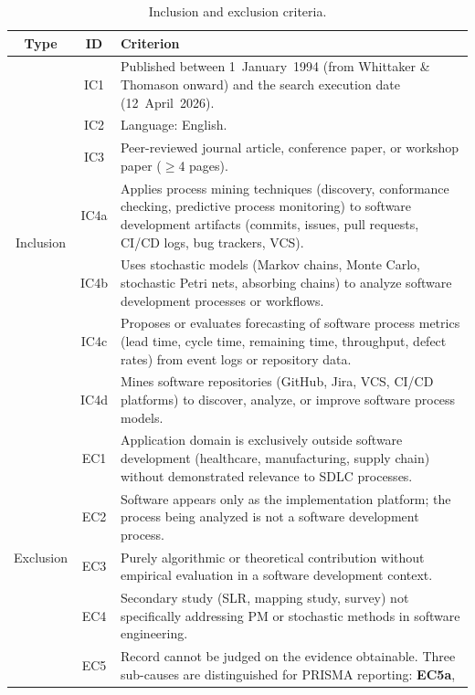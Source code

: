 \begin{table}[htbp]
\centering
\caption{Inclusion and exclusion criteria.}
\label{tab:criteria}
\small
\setlength{\tabcolsep}{4pt}
\begin{tabular}{c c p{10.2cm}}
\toprule
\textbf{Type} & \textbf{ID} & \textbf{Criterion} \\
\midrule
\multirow{7}{*}{Inclusion}
& IC1  & Published between 1~January~1994 (from Whittaker \& Thomason
          onward) and the search execution date (12~April~2026). \\
& IC2  & Language: English. \\
& IC3  & Peer-reviewed journal article, conference paper, or workshop paper
          ($\geq$4 pages). \\
& IC4a & Applies process mining techniques (discovery, conformance checking,
          predictive process monitoring) to software development artifacts
          (commits, issues, pull requests, CI/CD logs, bug trackers, VCS). \\
& IC4b & Uses stochastic models (Markov chains, Monte Carlo, stochastic Petri
          nets, absorbing chains) to analyze software development processes or
          workflows. \\
& IC4c & Proposes or evaluates forecasting of software process metrics (lead
          time, cycle time, remaining time, throughput, defect rates) from
          event logs or repository data. \\
& IC4d & Mines software repositories (GitHub, Jira, VCS, CI/CD platforms) to
          discover, analyze, or improve software process models. \\
\midrule
\multirow{5}{*}{Exclusion}
& EC1  & Application domain is exclusively outside software development
          (healthcare, manufacturing, supply chain) without demonstrated
          relevance to SDLC processes. \\
& EC2  & Software appears only as the implementation platform; the process
          being analyzed is not a software development process. \\
& EC3  & Purely algorithmic or theoretical contribution without empirical
          evaluation in a software development context. \\
& EC4  & Secondary study (SLR, mapping study, survey) not specifically
          addressing PM or stochastic methods in software engineering. \\
& EC5  & Record cannot be judged on the evidence obtainable. Three
          sub-causes are distinguished for PRISMA reporting: \textbf{EC5a},

\end{tabular}
\end{table}
